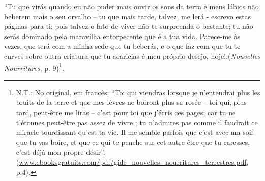 ``Tu que virás quando eu não puder mais ouvir os sons da terra e meus
lábios não beberem mais o seu orvalho -- tu que mais tarde, talvez, me
lerá - escrevo estas páginas para ti; pois talvez o fato de viver não te
surpreenda o bastante; tu não serás dominado pela maravilha entorpecente
que é a tua vida. Parece-me às vezes, que será com a minha sede que tu
beberás, e o que faz com que tu te curves sobre outra criatura que tu
acaricias é meu próprio desejo, hoje!.(\emph{Nouvelles Nourritures}, p.
9)\footnote{N.T.: No original, em francês: ``Toi qui viendras lorsque je
  n'entendrai plus les bruits de la terre et que mes lèvres ne boiront
  plus sa rosée -- toi qui, plus tard, peut-être me liras -- c'est pour
  toi que j'écris ces pages; car tu ne t'étonnes peut-être pas assez de
  vivre ; tu n'admires pas comme il faudrait ce miracle tourdissant
  qu'est ta vie. Il me semble parfois que c'est avec ma soif que tu vas
  boire, et que ce qui te penche sur cet autre être que tu caresses,
  c'est déjà mon propre désir''.
  (\href{http://www.ebooksgratuits.com/pdf/gide_nouvelles_nourritures_terrestres.pdf}{{www.ebooksgratuits.com/pdf/gide\_nouvelles\_nourritures\_terrestres.pdf}},
  p.4).}.
